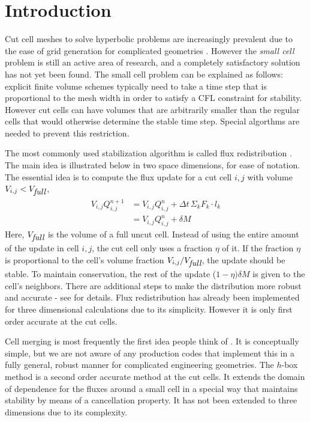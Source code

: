 \section{Introduction}\label{sec:intro}
Cut cell meshes to solve hyperbolic problems 
are increasingly prevalent due to the ease 
of grid generation for complicated geometries \cite{}. 
However the {\em small cell} problem is still an active area of research, and
a completely satisfactory solution has not yet been found.
The small cell problem can be explained as follows: explicit
finite volume schemes typically need to take a time step 
that is proportional to the mesh width in order to satisfy a CFL constraint for
stability. However cut cells can have volumes that are arbitrarily
smaller than the regular cells that would otherwise determine the stable time
step. Special algorthms are needed to prevent this restriction.

The most commonly used stabilization algorithm is called flux
redistribution \cite{chern:colella,vof:colella}. The main idea is illustrated below in two space
dimensions, for ease of notation.
The essential idea is to compute the 
flux update for a cut cell $i,j$ with volume $V_{i,j} < V_{\mbox{\em full}}$,
\begin{eqnarray*}
V_{i,j} Q_{i,j} ^{n+1} & = V_{i,j} Q_{i,j}^n  +  \Delta t \, \Sigma_k F_k \cdot l_{k}\\
                   & = V_{i,j} Q_{i,j}^n  +  \delta  M 
\end{eqnarray*}
Here, $V_{\mbox{\em full}}$ is the volume of a full uncut cell.
Instead of using the entire amount of the update in cell ${i,j}$, 
the cut cell only uses a fraction $\eta$ of it.  If the fraction $\eta$
is proportional to the cell's volume
fraction $V_{i,j}/V_{\mbox{\em full}}$, the update should be stable. 
To maintain conservation, the rest of the update ($1-\eta)\delta M$
is given to the cell's neighbors.  
There are additional steps to make the distribution more robust and
accurate - see \cite{} for details.
Flux redistribution has already been implemented for three dimensional
calculations due to its simplicity. However it is only first order
accurate at the cut cells.

Cell merging \cite{} is most frequently the first idea people 
think of . It is conceptually simple, but 
we are not aware of any production codes that implement this in a fully
general, robust manner for complicated engineering geometries. 
The $h$-box method \cite{}
is a second order accurate method at the cut cells. It extends the 
domain of dependence for the fluxes around a small cell in a 
special way that maintains stability by means of a cancellation
property. It  has not been extended to
three dimensions due to its complexity. 

